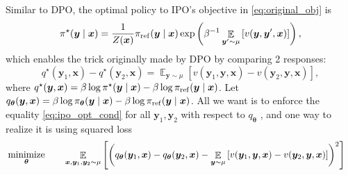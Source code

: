 \documentclass[11pt,a4paper]{article}
\begin{document}
Similar to DPO, the optimal policy to IPO's objective in \eqref{eq:original_obj} is
\[
\pi^{\star }(\bm{y} \mid \bm{x}) = \dfrac{1}{Z(\bm{x})} \pi_{\rm ref}(\bm{y} \mid \bm{x}) \exp \left( \beta^{-1} \mathop{\mathbb{E}}_{\bm{y}' \sim \mu} \left[ v(\bm{y}, \bm{y}', \bm{x}) \right] \right),
\] 
which enables the trick originally made by DPO by comparing 2 responses:
\begin{equation}
\label{eq:ipo_opt_cond}
q^{\star }(\bm{y}_1, \bm{x}) - q^{\star }(\bm{y}_2, \bm{x})
= \mathop{\mathbb{E}}_{\bm{y} \sim \mu}\left[v(\bm{y}_1, \bm{y}, \bm{x}) - v(\bm{y}_2, \bm{y}, \bm{x}) \right],
\end{equation} 
where $q^{\star }(\bm{y}, \bm{x}) = \beta \log \pi^{\star }(\bm{y}\mid \bm{x}) - \beta \log \pi_{\rm ref}(\bm{y} \mid \bm{x})$.
Let $ q_{\boldsymbol \theta}(\bm{y}, \bm{x}) = \beta \log \pi_{\boldsymbol \theta}(\bm{y}\mid \bm{x}) - \beta \log \pi_{\rm ref}(\bm{y} \mid \bm{x})$.
All we want is to enforce the equality \eqref{eq:ipo_opt_cond} for all $\bm{y}_1, \bm{y}_2$ with respect to $q_{\boldsymbol \theta}$ , and one way to realize it is using squared loss
\begin{alignat*}{2}
    & \operatorname*{\text{minimize}}_{\boldsymbol \theta} \quad && \mathop{\mathbb{E}}_{\bm{x}, \bm{y}_1, \bm{y}_2\sim \mu} \left[ \left(  q_{\boldsymbol \theta}(\bm{y}_1, \bm{x}) - q_{\boldsymbol \theta}(\bm{y}_2, \bm{x}) - \mathop{\mathbb{E}}_{\bm{y} \sim \mu}\left[v(\bm{y}_1, \bm{y}, \bm{x}) - v(\bm{y}_2, \bm{y}, \bm{x}) \right] \right) ^2\right]
\end{alignat*}
\end{document}
